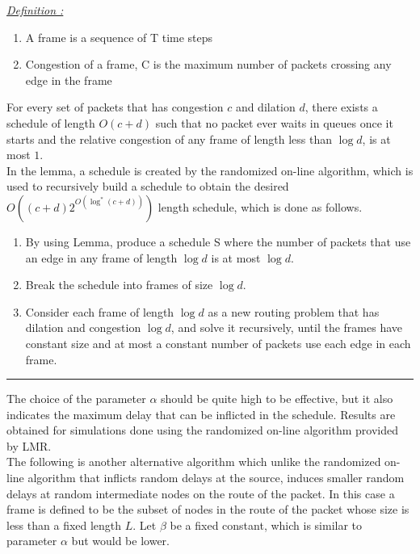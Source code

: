\documentclass[twoside,11pt]{article}
\begin{document}
\noindent \underline{\em Definition :}
\begin{enumerate}
\item A frame is a sequence of T time steps
\item Congestion of a frame, C is the maximum number of packets crossing any edge in the frame
\end{enumerate}

 For every set of packets that has congestion $c$ and dilation $d$, there exists a schedule of length $O(c + d)$ such that no packet ever waits in queues once it starts and the relative congestion of any frame of length less than $\log d$, is at most $1$. \\

In the lemma, a schedule is created by the randomized on-line algorithm, which is used to recursively build a schedule to obtain the desired $O((c+d)2^{O(\log^*(c+d))})$ length schedule, which is done as follows.

\begin{enumerate}
\item By using Lemma, produce a schedule S where the number of packets that use an edge in any frame of length $\log d$ is at most $\log d$.
\item Break the schedule into frames of size $\log d$.
\item Consider each frame of length $\log d$ as a new routing problem that has dilation and congestion $\log d$, and solve it recursively, until the frames have constant size and at most a constant number of packets use each edge in each frame.
\end{enumerate}
\hrule 
\vspace{0.1in}

\noindent The choice of the parameter $\alpha$ should be quite high to be effective, but it also indicates the maximum delay that can be inflicted in the schedule. Results are obtained for simulations done using the randomized on-line algorithm provided by LMR. \\


The following is another alternative algorithm which unlike the randomized on-line algorithm that inflicts random delays at the source, induces smaller random delays at random intermediate nodes on the route of the packet. In this case a frame is defined to be the subset of nodes in the route of the packet whose size is less than a fixed length $L$. Let $\beta$ be a fixed constant, which is similar to parameter $\alpha$ but would be lower. \\
\end{document}

